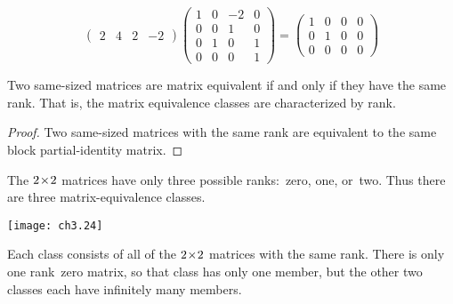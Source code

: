 \begin{example}
\begin{equation*}
\begin{pmatrix}
       2  &4  &2  &-2
    \end{pmatrix}
    \begin{pmatrix}
       1  &0  &-2  &0   \\
       0  &0  &1  &0   \\
       0  &1  &0  &1   \\
       0  &0  &0  &1
    \end{pmatrix}
    =
    \begin{pmatrix}
       1  &0  &0  &0   \\
       0  &1  &0  &0  \\
       0  &0  &0  &0
    \end{pmatrix}
\end{equation*}
\end{example}

\begin{corollary}
Two same-sized matrices are matrix equivalent if and only if they
have the same rank.
That is, the matrix equivalence classes are
characterized by rank.
\end{corollary}

\begin{proof}
Two same-sized matrices with the same rank
are equivalent to the same block partial-identity matrix.
\end{proof}

\begin{example}
The $2 \! \times \! 2$ matrices have
only three possible ranks:~zero, one, or~two.
Thus there are three matrix-equivalence classes.
\begin{center} %
  \texttt{[image: ch3.24]}
\end{center}
Each class consists of all of the $2 \! \times \! 2$ matrices with the same rank. 
There is only one rank~zero matrix, so that class has only
one member, but
the other two classes each have infinitely many members.
\end{example}


